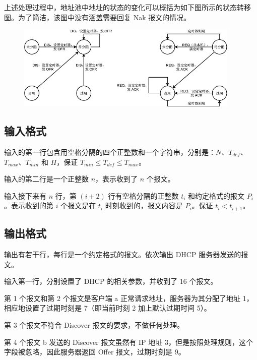 上述处理过程中，地址池中地址的状态的变化可以概括为如下图所示的状态转移图。为了简洁，该图中没有涵盖需要回复 Nak 报文的情况。

\begin{figure}[H]
    \centering
    \includegraphics[width=0.95\textwidth]{image/22/3-p-1.jpg}
\end{figure}


\subsection*{输入格式}

输入的第一行包含用空格分隔的四个正整数和一个字符串，分别是：$N$、$T_{def}$、$T_{max}$、$T_{min}$ 和 $H$，保证 $T_{min} \le T_{def} \le T_{max}$。

输入的第二行是一个正整数 $n$，表示收到了 $n$ 个报文。

输入接下来有 $n$ 行，第 $(i+2)$ 行有空格分隔的正整数 $t_i$ 和约定格式的报文 $P_i$。表示收到的第 $i$ 个报文是在 $t_i$ 时刻收到的，报文内容是 $P_i$。保证 $t_i < t_{i+1}$。


\subsection*{输出格式}

输出有若干行，每行是一个约定格式的报文。依次输出 DHCP 服务器发送的报文。

\examplebox*{}{}

输入第一行，分别设置了 DHCP 的相关参数，并收到了 16 个报文。

第 1 个报文和第 2 个报文是客户端 a 正常请求地址，服务器为其分配了地址 1，相应地设置了过期时刻是 7（即当前时刻 2 加上默认过期时间 5）。

第 3 个报文不符合 Discover 报文的要求，不做任何处理。

第 4 个报文 b 发送的 Discover 报文虽然有 IP 地址 3，但是按照处理规则，这个字段被忽略，因此服务器返回 Offer 报文，过期时刻是 9。

